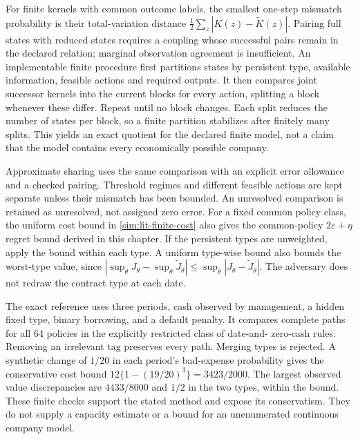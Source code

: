 For finite kernels with common outcome labels, the smallest one-step mismatch
probability is their total-variation distance
$\frac12\sum_z|K(z)-\widetilde K(z)|$. Pairing full states with reduced states
requires a coupling whose successful pairs remain in the declared relation;
marginal observation agreement is insufficient. An implementable finite
procedure first partitions states by persistent type, available information,
feasible actions and required outputs. It then compares joint successor
kernels into the current blocks for every action, splitting a block whenever
these differ. Repeat until no block changes. Each split reduces the number of
states per block, so a finite partition stabilizes after finitely many splits.
This yields an exact quotient for the declared finite model, not a claim that
the model contains every economically possible company.

Approximate sharing uses the same comparison with an explicit error allowance
and a checked pairing. Threshold regimes and different feasible actions are
kept separate unless their mismatch has been bounded. An unresolved comparison
is retained as unresolved, not assigned zero error. For a fixed common policy
class, the uniform cost bound in \eqref{sim:lit-finite-cost} also gives the common-policy
$2\varepsilon+\eta$ regret bound derived in this chapter. If the persistent types are unweighted,
apply the bound within each type. A uniform type-wise bound also bounds the
worst-type value, since
$|\sup_\theta J_\theta-\sup_\theta\widetilde J_\theta|
\le\sup_\theta|J_\theta-\widetilde J_\theta|$.
The adversary does not redraw the contract type at each date.

The exact reference uses three periods, cash observed by management, a hidden
fixed type, binary borrowing, and a default penalty. It compares complete
paths for all 64 policies in the explicitly restricted class of date-and-
zero-cash rules. Removing an irrelevant tag preserves every path. Merging
types is rejected. A synthetic change of $1/20$ in each period's bad-expense
probability gives the conservative cost bound
$12\{1-(19/20)^3\}=3423/2000$. The largest observed value discrepancies are
$4433/8000$ and $1/2$ in the two types, within the bound. These finite checks
support the stated method and expose its conservatism. They do not supply a
capacity estimate or a bound for an unenumerated continuous company model.

